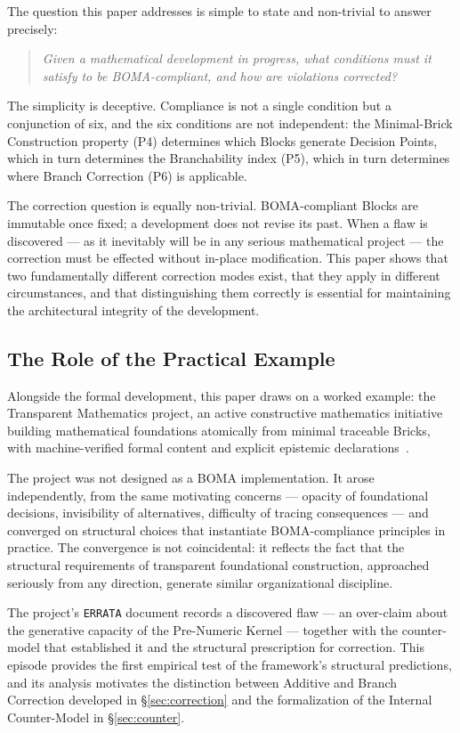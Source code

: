\documentclass[12pt, a4paper]{article}
\theoremstyle{plain}
\theoremstyle{definition}
\theoremstyle{remark}
\newcommand{\BOMA}{\textsf{BOMA}}
\begin{document}
The question this paper addresses is simple to state and non-trivial
to answer precisely:
\begin{quote}
\emph{Given a mathematical development in progress, what conditions
must it satisfy to be \BOMA{}-compliant, and how are violations
corrected?}
\end{quote}

The simplicity is deceptive. Compliance is not a single condition but
a conjunction of six, and the six conditions are not independent: the
Minimal-Brick Construction property (P4) determines which Blocks
generate Decision Points, which in turn determines the Branchability
index (P5), which in turn determines where Branch Correction (P6) is
applicable.

The correction question is equally non-trivial. \BOMA{}-compliant
Blocks are immutable once fixed; a development does not revise its
past. When a flaw is discovered --- as it inevitably will be in any
serious mathematical project --- the correction must be effected
without in-place modification. This paper shows that two
fundamentally different correction modes exist, that they apply in
different circumstances, and that distinguishing them correctly is
essential for maintaining the architectural integrity of the
development.

\subsection{The Role of the Practical Example}
\label{subsec:example}

Alongside the formal development, this paper draws on a worked
example: the Transparent Mathematics project, an active constructive
mathematics initiative building mathematical foundations atomically
from minimal traceable Bricks, with machine-verified formal content
and explicit epistemic declarations~\cite{TransparentMath}.

The project was not designed as a \BOMA{} implementation. It arose
independently, from the same motivating concerns --- opacity of
foundational decisions, invisibility of alternatives, difficulty of
tracing consequences --- and converged on structural choices that
instantiate \BOMA{}-compliance principles in practice. The convergence
is not coincidental: it reflects the fact that the structural
requirements of transparent foundational construction, approached
seriously from any direction, generate similar organizational
discipline.

The project's \texttt{ERRATA} document records a discovered flaw ---
an over-claim about the generative capacity of the Pre-Numeric Kernel
--- together with the counter-model that established it and the
structural prescription for correction. This episode provides the
first empirical test of the framework's structural predictions, and
its analysis motivates the distinction between Additive and Branch
Correction developed in \S\ref{sec:correction} and the formalization
of the Internal Counter-Model in \S\ref{sec:counter}.
\end{document}
